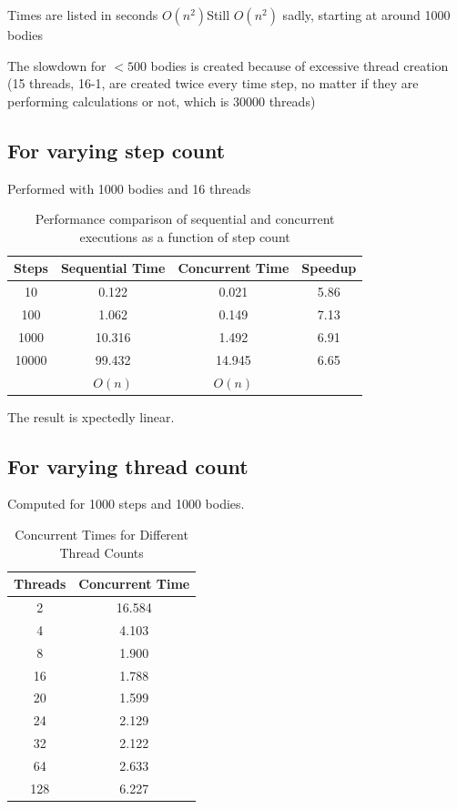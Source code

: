 \documentclass{article}
\begin{document}
Times are listed in seconds
$O(n^2)	$Still $O(n^2)$ sadly, starting at around 1000 bodies				
						
The slowdown for $<500$ bodies is created because of excessive thread creation (15 threads, 16-1, are created twice every time step, no matter if they are performing calculations or not, which is 30000 threads)					

\subsection{For varying step count}
Performed with 1000 bodies and 16 threads
\begin{table}[h]
  \centering
  \begin{tabular}{|c|c|c|c|}
    \hline
    Steps & Sequential Time & Concurrent Time & Speedup \\ \hline
    10 & 0.122 & 0.021 & 5.86 \\ \hline
    100 & 1.062 & 0.149 & 7.13 \\ \hline
    1000 & 10.316 & 1.492 & 6.91 \\ \hline
    10000 & 99.432 & 14.945 & 6.65 \\ \hline
    & $O(n)$ & $O(n)$ & \\ \hline
  \end{tabular}
  \caption{Performance comparison of sequential and concurrent executions as a function of step count}
  \label{tab:performance_comparison}
\end{table}

		
The result is xpectedly linear.			

\subsection{For varying thread count}
Computed for 1000 steps and 1000 bodies.



\begin{table}[h]
  \centering
  \begin{tabular}{|c|c|}
    \hline
    Threads & Concurrent Time \\ \hline
    2  & 16.584 \\ \hline
    4  & 4.103 \\ \hline
    8  & 1.900 \\ \hline
    16 & 1.788 \\ \hline
    20 & 1.599 \\ \hline
    24 & 2.129 \\ \hline
    32 & 2.122 \\ \hline
    64 & 2.633 \\ \hline
    128 & 6.227 \\ \hline
  \end{tabular}
  \caption{Concurrent Times for Different Thread Counts}
  \label{tab:concurrent_times}
\end{table}
	
\end{document}

